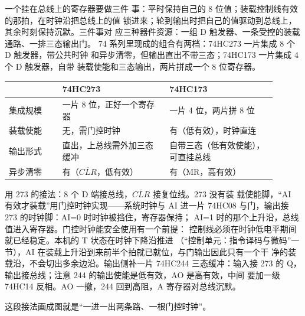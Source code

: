一个挂在总线上的寄存器要做三件
事：平时保持自己的 8 位值；装载控制线有效的那拍，在时钟沿把总线上的值
锁进来；轮到输出时把自己的值驱动到总线上，其余时刻保持沉默。三件事对
应三种器件资源：一组 D 触发器、一条受控的装载通路、一排三态输出门。
74 系列里现成的组合有两档：74HC273 一片集成 8 个 D 触发器，带公共时钟
和异步清零，但输出直出不带三态；74HC173 一片集成 4 个 D 触发器，自带
装载使能和三态输出，两片拼成一个 8 位寄存器。

\begin{longtable}{L{0.18\linewidth}L{0.36\linewidth}L{0.36\linewidth}}
\toprule
 & 74HC273 & 74HC173 \\
\midrule
集成规模 & 一片 8 位，正好一个寄存器 & 一片 4 位，两片拼 8 位 \\\tablerowrule
装载使能 & 无，需门控时钟 & 有（低有效），时钟直连 \\\tablerowrule
输出形式 & 直出，上总线需外加三态缓冲 & 自带三态（低有效使能），可直挂总线 \\\tablerowrule
异步清零 & 有（$\overline{CLR}$，低有效） & 有（MR，高有效） \\
\bottomrule
\end{longtable}

用 273 的接法：8 个 D 端接总线，$\overline{CLR}$ 接复位线。273 没有装
载使能脚，“AI 有效才装载”用门控时钟实现——系统时钟与 AI 进一片
74HC08 与门，输出接 273 的时钟脚：AI=0 时时钟被挡住，寄存器保持；
AI=1 时的那个上升沿，总线值进入寄存器。门控时钟能安全使用有一个前提：
控制线必须在时钟低电平期间就已经稳定。本机的 T 状态在时钟下降沿推进
（“控制单元：指令译码与微码”一节），AI 在装载上升沿到来前半个拍就已就位，与门输出因此只有一个干
净的装载沿，不会切出多余边沿。输出侧补一片 74HC244 三态缓冲：输入接
273 的 Q，输出接总线；注意 244 的输出使能是低有效，AO 是高有效，中间
要加一级 74HC14 反相。AO 一撤，244 回到高阻，A 寄存器对总线沉默。

这段接法画成图就是“一进一出两条路、一根门控时钟”。

